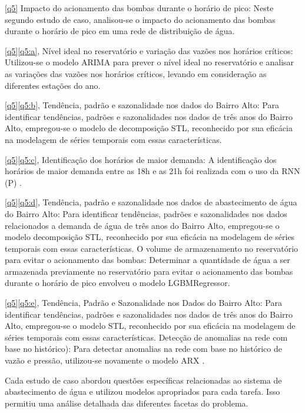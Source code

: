 \eqref{q5} Impacto do acionamento das bombas durante o horário de pico: Neste segundo estudo de caso, analisou-se o impacto do acionamento das bombas durante o horário de pico em uma rede de distribuição de água.

\ref{q5}\eqref{q5:a}, Nível ideal no reservatório e variação das vazões nos horários críticos: Utilizou-se o modelo ARIMA \cite{2-s2.0-85069459067} para prever o nível ideal no reservatório e analisar as variações das vazões nos horários críticos, levando em consideração as diferentes estações do ano.

\ref{q5}\eqref{q5:b}, Tendência, padrão e sazonalidade nos dados do Bairro Alto: Para identificar tendências, padrões e sazonalidades nos dados de três anos do Bairro Alto, empregou-se o modelo de decomposição STL, reconhecido por sua eficácia na modelagem de séries temporais com essas características.

\ref{q5}\eqref{q5:c}, Identificação dos horários de maior demanda: A identificação dos horários de maior demanda entre as 18h e as 21h foi realizada com o uso da RNN (P) \cite{2-s2.0-85067419084}.

\ref{q5}\eqref{q5:d}, Tendência, padrão e sazonalidade nos dados de abastecimento de água do Bairro Alto: Para identificar tendências, padrões e sazonalidades nos dados relacionados a demanda de água de três anos do Bairro Alto, empregou-se o modelo decomposição STL, reconhecido por sua eficácia na modelagem de séries temporais com essas características. O volume de armazenamento no reservatório para evitar o acionamento das bombas: Determinar a quantidade de água a ser armazenada previamente no reservatório para evitar o acionamento das bombas durante o horário de pico envolveu o modelo LGBMRegressor.

\ref{q5}\eqref{q5:e}, Tendência, Padrão e Sazonalidade nos Dados do Bairro Alto: Para identificar tendências, padrões e sazonalidades nos dados de três anos do Bairro Alto, empregou-se o modelo STL, reconhecido por sua eficácia na modelagem de séries temporais com essas características. Detecção de anomalias na rede com base no histórico): Para detectar anomalias na rede com base no histórico de vazão e pressão, utilizou-se novamente o modelo ARX \cite{2-s2.0-85051469381}.

Cada estudo de caso abordou questões específicas relacionadas ao sistema de abastecimento de água e utilizou modelos apropriados para cada tarefa. Isso permitiu uma análise detalhada das diferentes facetas do problema.

